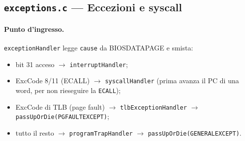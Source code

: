 \documentclass[11pt,a4paper]{article}
\newcommand{\code}[1]{\texttt{#1}}
\begin{document}
\subsection{\code{exceptions.c} --- Eccezioni e syscall}

\paragraph{Punto d'ingresso.} \code{exceptionHandler} legge \code{cause} da
BIOSDATAPAGE e smista:
\begin{itemize}
\item bit 31 acceso $\to$ \code{interruptHandler};
\item ExcCode 8/11 (ECALL) $\to$ \code{syscallHandler} (prima avanza il PC di
  una word, per non rieseguire la \code{ECALL});
\item ExcCode di TLB (page fault) $\to$ \code{tlbExceptionHandler} $\to$
  \code{passUpOrDie(PGFAULTEXCEPT)};
\item tutto il resto $\to$ \code{programTrapHandler} $\to$
  \code{passUpOrDie(GENERALEXCEPT)}.
\end{itemize}
\end{document}
